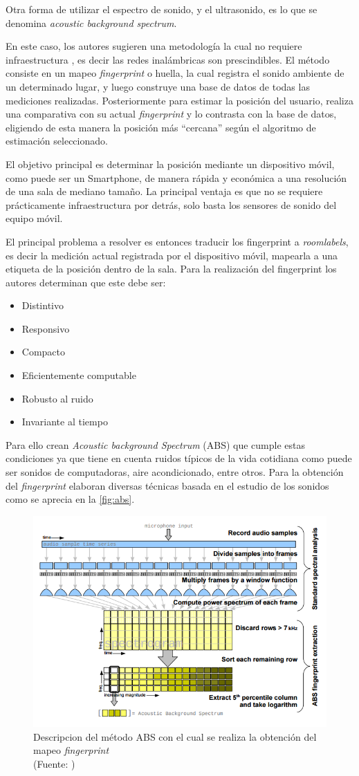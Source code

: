 Otra forma de utilizar el espectro de sonido, y el ultrasonido, es lo que se denomina \textit{acoustic background spectrum}.

En este caso, los autores sugieren una metodología la cual no requiere infraestructura \cite{Tarzia:2011:ILW:1999995.2000011}, es decir las redes inalámbricas son prescindibles. El método consiste en un mapeo \textit{fingerprint} o huella, la cual registra el sonido ambiente de un determinado lugar, y luego construye una base de datos de todas las mediciones realizadas. Posteriormente para estimar la posición del usuario, realiza una comparativa con su actual \textit{fingerprint} y lo contrasta con la base de datos,  eligiendo de esta manera la posición más “cercana” según el algoritmo de estimación seleccionado.

El objetivo principal es determinar la posición mediante un dispositivo móvil, como puede ser un Smartphone, de manera rápida y económica a una resolución de una sala de mediano tamaño. La principal ventaja es que no se requiere prácticamente infraestructura por detrás, solo basta los sensores de sonido del equipo móvil.

El principal problema a resolver es entonces traducir los fingerprint a \textit{roomlabels}, es decir la medición actual registrada por el dispositivo móvil, mapearla a una etiqueta de la posición dentro de la sala. Para la realización del fingerprint los autores determinan que este debe ser:

\begin{itemize}
\item Distintivo
\item Responsivo
\item Compacto
\item Eficientemente computable
\item Robusto al ruido
\item Invariante al tiempo
\end{itemize}

Para ello crean \textit{Acoustic background Spectrum} (ABS) que cumple estas condiciones ya que tiene en cuenta ruidos típicos de la vida cotidiana como puede ser sonidos de computadoras, aire acondicionado, entre otros. Para la obtención del \textit{fingerprint} elaboran diversas técnicas basada en el estudio de los sonidos como se aprecia en la  \autoref{fig:abs}.

\begin{figure}[ht!]
\centering
\includegraphics[width=.4\textwidth]{figures/abs.png}
\caption[abs]{Descripcion del método ABS con el cual se realiza la obtención del mapeo \textit{fingerprint}\\
{\scriptsize (Fuente: \cite{Tarzia:2011:ILW:1999995.2000011})}}
\label{fig:abs}
\end{figure}

